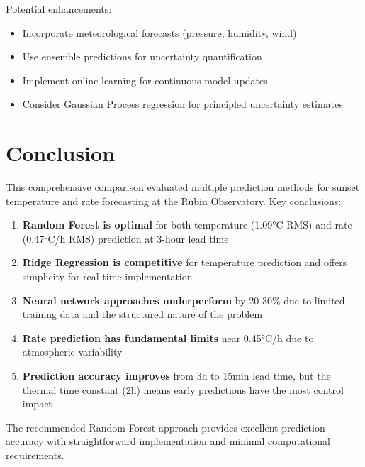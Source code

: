 \documentclass[11pt,letterpaper]{article}
\begin{document}
Potential enhancements:
\begin{itemize}
    \item Incorporate meteorological forecasts (pressure, humidity, wind)
    \item Use ensemble predictions for uncertainty quantification
    \item Implement online learning for continuous model updates
    \item Consider Gaussian Process regression for principled uncertainty estimates
\end{itemize}

\section{Conclusion}

This comprehensive comparison evaluated multiple prediction methods for sunset temperature and rate forecasting at the Rubin Observatory. Key conclusions:

\begin{enumerate}
    \item \textbf{Random Forest is optimal} for both temperature (1.09°C RMS) and rate (0.47°C/h RMS) prediction at 3-hour lead time

    \item \textbf{Ridge Regression is competitive} for temperature prediction and offers simplicity for real-time implementation

    \item \textbf{Neural network approaches underperform} by 20-30\% due to limited training data and the structured nature of the problem

    \item \textbf{Rate prediction has fundamental limits} near 0.45°C/h due to atmospheric variability

    \item \textbf{Prediction accuracy improves} from 3h to 15min lead time, but the thermal time constant (2h) means early predictions have the most control impact
\end{enumerate}

The recommended Random Forest approach provides excellent prediction accuracy with straightforward implementation and minimal computational requirements.

\appendix
\end{document}
